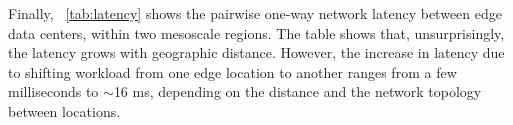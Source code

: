 \begin{table}[t]
  \centering
    \caption{One-way network latency (ms).  %
    } 
  \label{tab:latency}
\end{table}




Finally, ~\autoref{tab:latency} shows the pairwise one-way network latency between edge data centers, within two mesoscale regions. The table shows that, unsurprisingly, the latency grows with geographic distance. However, the increase in latency due to shifting workload from one edge location to another ranges from a few milliseconds to $\sim$16 ms, depending on the distance and the network topology between locations. 




